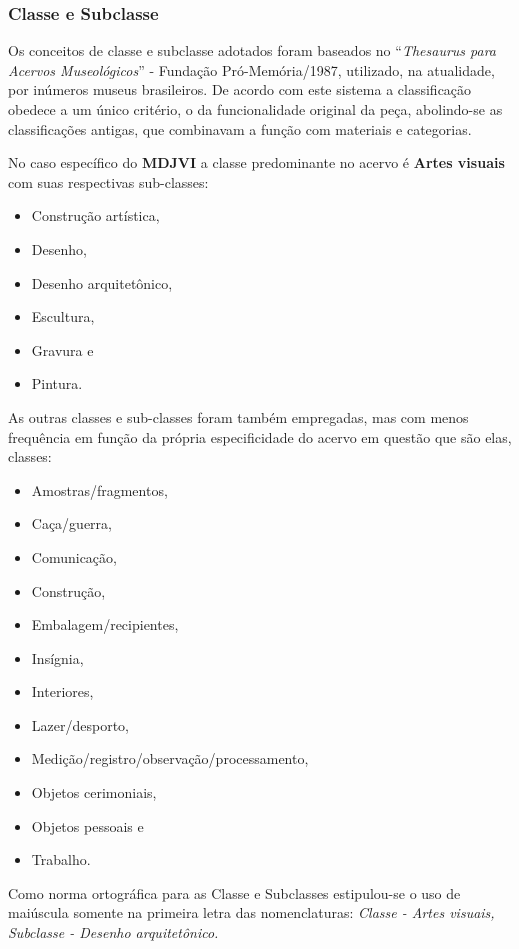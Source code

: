 \subsubsection{Classe e Subclasse}
Os conceitos de classe e subclasse adotados foram baseados no ``\textit{Thesaurus para Acervos Museológicos}'' - Fundação Pró-Memória/1987, utilizado, na atualidade, por inúmeros museus brasileiros. De acordo com este sistema a classificação obedece a um único critério, o da funcionalidade original da peça, abolindo-se as classificações antigas, que combinavam a função com materiais e categorias. 

No caso específico do \textbf{MDJVI} a classe predominante no acervo é \textbf{Artes visuais} com suas respectivas sub-classes: 
\begin{itemize}
	\item Construção artística, 
	\item Desenho, 
	\item Desenho arquitetônico, 
	\item Escultura, 
	\item Gravura e 
	\item Pintura.
\end{itemize} 

As outras classes e sub-classes foram também empregadas, mas com menos frequência em função da própria especificidade do acervo em questão que são elas, classes: 
\begin{itemize}
	\item Amostras/fragmentos, 
	\item Caça/guerra, 
	\item Comunicação, 
	\item Construção, 
	\item Embalagem/recipientes, 
	\item Insígnia, 
	\item Interiores, 
	\item Lazer/desporto,
	\item Medição/registro/observação/processamento, 
	\item Objetos cerimoniais, 
	\item Objetos pessoais e 
	\item Trabalho.
\end{itemize} 

Como norma ortográfica para as Classe e Subclasses
estipulou-se o uso de maiúscula somente na primeira letra das nomenclaturas: \textit{Classe - Artes visuais, Subclasse - Desenho arquitetônico.}


